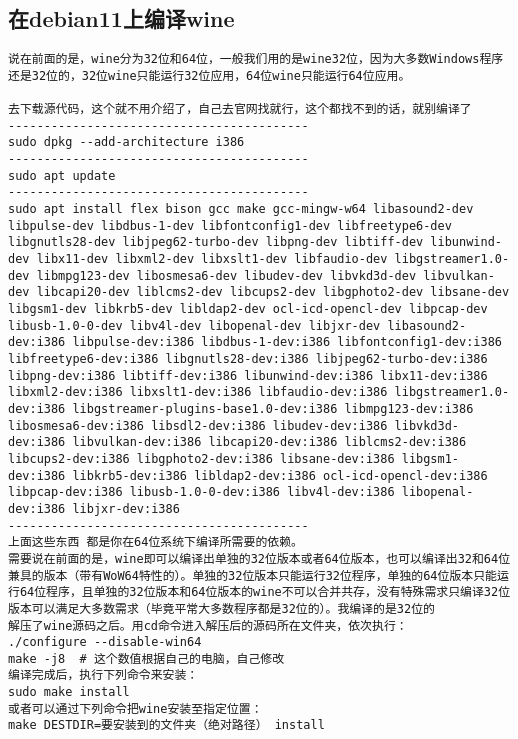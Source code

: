 \documentclass[a4paper,fontset=fandol,zihao=-4,linespread=1.2,oneside]{ctexbook}
\begin{document}
\subsection{在debian11上编译wine}
\begin{lstlisting}
说在前面的是，wine分为32位和64位，一般我们用的是wine32位，因为大多数Windows程序还是32位的，32位wine只能运行32位应用，64位wine只能运行64位应用。

去下载源代码，这个就不用介绍了，自己去官网找就行，这个都找不到的话，就别编译了
------------------------------------------
sudo dpkg --add-architecture i386
------------------------------------------
sudo apt update
------------------------------------------
sudo apt install flex bison gcc make gcc-mingw-w64 libasound2-dev libpulse-dev libdbus-1-dev libfontconfig1-dev libfreetype6-dev libgnutls28-dev libjpeg62-turbo-dev libpng-dev libtiff-dev libunwind-dev libx11-dev libxml2-dev libxslt1-dev libfaudio-dev libgstreamer1.0-dev libmpg123-dev libosmesa6-dev libudev-dev libvkd3d-dev libvulkan-dev libcapi20-dev liblcms2-dev libcups2-dev libgphoto2-dev libsane-dev libgsm1-dev libkrb5-dev libldap2-dev ocl-icd-opencl-dev libpcap-dev libusb-1.0-0-dev libv4l-dev libopenal-dev libjxr-dev libasound2-dev:i386 libpulse-dev:i386 libdbus-1-dev:i386 libfontconfig1-dev:i386 libfreetype6-dev:i386 libgnutls28-dev:i386 libjpeg62-turbo-dev:i386 libpng-dev:i386 libtiff-dev:i386 libunwind-dev:i386 libx11-dev:i386 libxml2-dev:i386 libxslt1-dev:i386 libfaudio-dev:i386 libgstreamer1.0-dev:i386 libgstreamer-plugins-base1.0-dev:i386 libmpg123-dev:i386 libosmesa6-dev:i386 libsdl2-dev:i386 libudev-dev:i386 libvkd3d-dev:i386 libvulkan-dev:i386 libcapi20-dev:i386 liblcms2-dev:i386 libcups2-dev:i386 libgphoto2-dev:i386 libsane-dev:i386 libgsm1-dev:i386 libkrb5-dev:i386 libldap2-dev:i386 ocl-icd-opencl-dev:i386 libpcap-dev:i386 libusb-1.0-0-dev:i386 libv4l-dev:i386 libopenal-dev:i386 libjxr-dev:i386
------------------------------------------
上面这些东西 都是你在64位系统下编译所需要的依赖。
需要说在前面的是，wine即可以编译出单独的32位版本或者64位版本，也可以编译出32和64位兼具的版本（带有WoW64特性的）。单独的32位版本只能运行32位程序，单独的64位版本只能运行64位程序，且单独的32位版本和64位版本的wine不可以合并共存，没有特殊需求只编译32位版本可以满足大多数需求（毕竟平常大多数程序都是32位的）。我编译的是32位的
解压了wine源码之后。用cd命令进入解压后的源码所在文件夹，依次执行：
./configure --disable-win64
make -j8  # 这个数值根据自己的电脑，自己修改
编译完成后，执行下列命令来安装：
sudo make install
或者可以通过下列命令把wine安装至指定位置：
make DESTDIR=要安装到的文件夹（绝对路径） install

\end{lstlisting}
\end{document}
